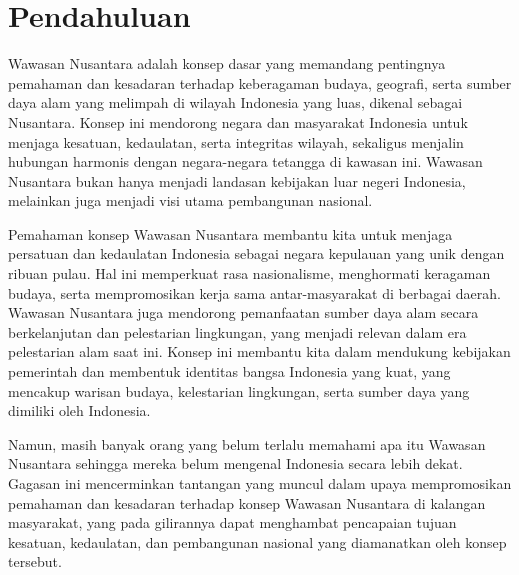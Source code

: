 \section{Pendahuluan}
Wawasan Nusantara adalah konsep dasar yang memandang pentingnya pemahaman dan kesadaran terhadap keberagaman budaya, geografi, serta sumber daya alam yang melimpah di wilayah Indonesia yang luas, dikenal sebagai Nusantara. Konsep ini mendorong negara dan masyarakat Indonesia untuk menjaga kesatuan, kedaulatan, serta integritas wilayah, sekaligus menjalin hubungan harmonis dengan negara-negara tetangga di kawasan ini. Wawasan Nusantara bukan hanya menjadi landasan kebijakan luar negeri Indonesia, melainkan juga menjadi visi utama pembangunan nasional.

Pemahaman konsep Wawasan Nusantara membantu kita untuk menjaga persatuan dan kedaulatan Indonesia sebagai negara kepulauan yang unik dengan ribuan pulau. Hal ini memperkuat rasa nasionalisme, menghormati keragaman budaya, serta mempromosikan kerja sama antar-masyarakat di berbagai daerah. Wawasan Nusantara juga mendorong pemanfaatan sumber daya alam secara berkelanjutan dan pelestarian lingkungan, yang menjadi relevan dalam era pelestarian alam saat ini. Konsep ini membantu kita dalam mendukung kebijakan pemerintah dan membentuk identitas bangsa Indonesia yang kuat, yang mencakup warisan budaya, kelestarian lingkungan, serta sumber daya yang dimiliki oleh Indonesia.

Namun, masih banyak orang yang belum terlalu memahami apa itu Wawasan Nusantara sehingga mereka belum mengenal Indonesia secara lebih dekat. Gagasan ini mencerminkan tantangan yang muncul dalam upaya mempromosikan pemahaman dan kesadaran terhadap konsep Wawasan Nusantara di kalangan masyarakat, yang pada gilirannya dapat menghambat pencapaian tujuan kesatuan, kedaulatan, dan pembangunan nasional yang diamanatkan oleh konsep tersebut.

